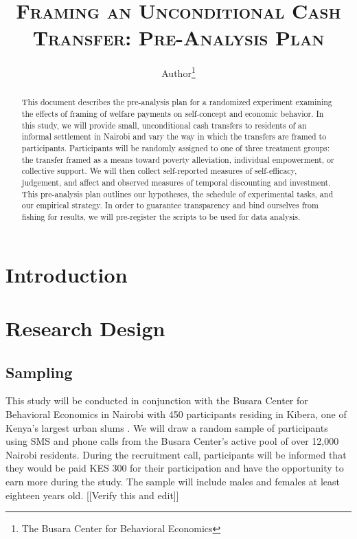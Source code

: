 \documentclass[11pt, a4paper]{article}\usepackage[]{graphicx}\usepackage[]{color}
\begin{document}
\title{\textsc{Framing an Unconditional Cash Transfer: Pre-Analysis Plan}}
\author{Author\footnote{The Busara Center for Behavioral Economics}}

\maketitle

\begin{abstract}

    This document describes the pre-analysis plan for a randomized experiment examining the effects of framing of welfare payments on self-concept and economic behavior. In this study, we will provide small, unconditional cash transfers to residents of an informal settlement in Nairobi and vary the way in which the transfers are framed to participants. Participants will be randomly assigned to one of three treatment groups: the transfer framed as a means toward poverty alleviation, individual empowerment, or collective support. We will then collect self-reported measures of self-efficacy, judgement, and affect and observed measures of temporal discounting and investment. This pre-analysis plan outlines our hypotheses, the schedule of experimental tasks, and our empirical strategy. In order to guarantee transparency and bind ourselves from fishing for results, we will pre-register the scripts to be used for data analysis.

\end{abstract}

\newpage

\tableofcontents

\newpage

\section{Introduction}

\section{Research Design}

    \subsection{Sampling}

        This study will be conducted in conjunction with the Busara Center for Behavioral Economics in Nairobi with 450 participants residing in Kibera, one of Kenya's largest urban slums \parencite{haushofer_methodology_2014}. We will draw a random sample of participants using SMS and phone calls from the Busara Center's active pool of over 12,000 Nairobi residents. During the recruitment call, participants will be informed that they would be paid KES 300 for their participation and have the opportunity to earn more during the study. The sample will include males and females at least eighteen years old. [[Verify this and edit]]
\end{document}
